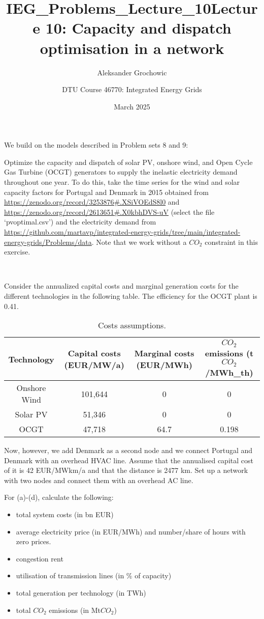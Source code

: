 \documentclass[10pt]{article}
\title{IEG_Problems_Lecture_10}
\author{Aleksander Grochowic}
\date{March 2025}
\newenvironment{problem}[2][Problem]{\begin{trivlist}
\item[\hskip \labelsep {\bfseries #1}\hskip \labelsep {\bfseries #2.}]}{\end{trivlist}}
\begin{document}
 
\title{\textbf{Lecture 10: Capacity and dispatch optimisation in a network}}
\author{
DTU Course 46770: Integrated Energy Grids }
\maketitle

\begin{problem}{10.1}
We build on the models described in Problem sets 8 and 9:

Optimize the capacity and dispatch of solar PV, onshore wind, and Open Cycle Gas Turbine (OCGT) generators to supply the inelastic electricity demand throughout one year. 
To do this, take the time series for the wind and solar capacity factors for Portugal and Denmark in 2015 obtained from \url{https://zenodo.org/record/3253876#.XSiVOEdS8l0}
and \url{https://zenodo.org/record/2613651#.X0kbhDVS-uV} (select the file ‘pvoptimal.csv’) and the electricity demand from \url{https://github.com/martavp/integrated-energy-grids/tree/main/integrated-energy-grids/Problems/data}. Note that we work without a $CO_2$ constraint in this exercise.

\

Consider the annualized capital costs and marginal generation costs for the different technologies in the following table. The efficiency for the OCGT plant is 0.41.

\begin{table}[h]
	\centering
	\begin{tabular}{cccc}
		\hline
		Technology & Capital costs (EUR/MW/a) & Marginal costs (EUR/MWh) & $CO_2$ emissions (t$CO_2$/MWh_{th}) \\
		\hline
		Onshore Wind &  101,644 & 0 & 0 \\
		Solar PV &  51,346 & 0 & 0 \\
		OCGT & 47,718 &  64.7 & 0.198  \\
		\hline
	\end{tabular}
	\caption{Costs assumptions.}
	\label{tab:my_label}
\end{table}


Now, however, we add Denmark as a second node and we connect Portugal and Denmark with an overhead HVAC line. Assume that the annualised capital cost of it is 42 EUR/MWkm/a and that the distance is 2477 km. Set up a network with two nodes and connect them with an overhead AC line.

For (a)-(d), calculate the following:
\begin{itemize}
	\item total system costs (in bn EUR)
	\item average electricity price (in EUR/MWh) and number/share of hours with zero prices.
	\item congestion rent 
	\item utilisation of transmission lines (in \% of capacity)
	\item total generation per technology (in TWh)
	\item total $CO_2$ emissions (in Mt$CO_2$)
\end{itemize}


\end{problem}
\end{document}
